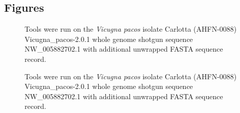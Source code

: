 \documentclass{bmcart}
\begin{document}
\begin{backmatter}





\section*{Figures}
   \begin{figure}[h!]
  \caption{
      Tools were run on the \textit{Vicugna pacos} isolate Carlotta (AHFN-0088) Vicugna\_pacos-2.0.1 whole genome shotgun sequence NW\_005882702.1 with additional unwrapped FASTA sequence record.}
      \end{figure}

\begin{figure}[h!]
  \caption{
     Tools were run on the \textit{Vicugna pacos} isolate Carlotta (AHFN-0088) Vicugna\_pacos-2.0.1 whole genome shotgun sequence NW\_005882702.1 with additional unwrapped FASTA sequence record.}
      \end{figure}            



\end{backmatter}
\end{document}
